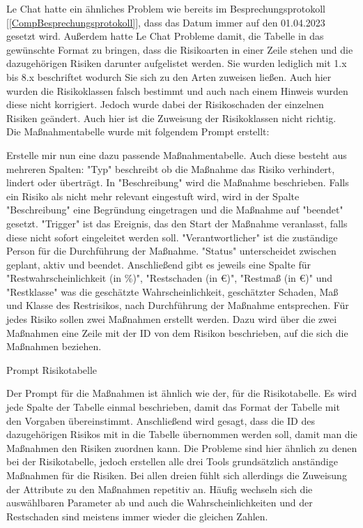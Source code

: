 Le Chat hatte ein ähnliches Problem wie bereits im Besprechungsprotokoll [\autoref{CompBesprechungsprotokoll}], dass das 
Datum immer auf den 01.04.2023 gesetzt wird. Außerdem hatte Le Chat Probleme damit, die Tabelle in das gewünschte Format
zu bringen, dass die Risikoarten in einer Zeile stehen und die dazugehörigen Risiken darunter aufgelistet werden. Sie wurden 
lediglich mit 1.x bis 8.x beschriftet wodurch Sie sich zu den Arten zuweisen ließen. Auch 
hier wurden die Risikoklassen falsch bestimmt und auch nach einem Hinweis wurden diese nicht korrigiert. Jedoch wurde 
dabei der Risikoschaden der einzelnen Risiken geändert. Auch hier ist die Zuweisung der Risikoklassen nicht richtig.\\

Die Maßnahmentabelle wurde mit folgendem Prompt erstellt:

\begin{prompt}[H]
    \begin{tcolorbox}[colback=gray!20, colframe=gray!20, boxrule=0pt, sharp corners] 
        Erstelle mir nun eine dazu passende Maßnahmentabelle. Auch diese besteht aus mehreren Spalten: "Typ" beschreibt 
        ob die Maßnahme das Risiko verhindert, lindert oder überträgt. In "Beschreibung" wird die Maßnahme beschrieben. 
        Falls ein Risiko als nicht mehr relevant eingestuft wird, wird in der Spalte "Beschreibung" eine Begründung 
        eingetragen und die Maßnahme auf "beendet" gesetzt. "Trigger" ist das Ereignis, das den Start der Maßnahme 
        veranlasst, falls diese nicht sofort eingeleitet werden soll. "Verantwortlicher" ist die zuständige Person für 
        die Durchführung der Maßnahme. "Status" unterscheidet zwischen geplant, aktiv und beendet. Anschließend gibt es 
        jeweils eine Spalte für "Restwahrscheinlichkeit (in \%)", "Restschaden (in €)", "Restmaß (in €)" und "Restklasse" 
        was die geschätzte Wahrscheinlichkeit, geschätzter Schaden, Maß und Klasse des Restrisikos, nach Durchführung der 
        Maßnahme entsprechen. Für jedes Risiko sollen zwei Maßnahmen erstellt werden. Dazu wird über die zwei Maßnahmen 
        eine Zeile mit der ID von dem Risikon beschrieben, auf die sich die Maßnahmen beziehen.
        \vfill
    \end{tcolorbox}
    \caption{Prompt Risikotabelle}
    \label{Prompt Risikotabelle}
\end{prompt}

Der Prompt für die Maßnahmen ist ähnlich wie der, für die Risikotabelle. Es wird jede Spalte der Tabelle einmal beschrieben,
damit das Format der Tabelle mit den Vorgaben übereinstimmt. Anschließend wird gesagt, dass die ID des dazugehörigen Risikos
mit in die Tabelle übernommen werden soll, damit man die Maßnahmen den Risiken zuordnen kann. Die Probleme sind hier 
ähnlich zu denen bei der Risikotabelle, jedoch erstellen alle drei Tools grundsätzlich anständige Maßnahmen für die Risiken.
Bei allen dreien fühlt sich allerdings die Zuweisung der Attribute zu den Maßnahmen repetitiv an. Häufig wechseln sich die 
auswählbaren Parameter ab und auch die Wahrscheinlichkeiten und der Restschaden sind meistens immer wieder die gleichen Zahlen.\\

